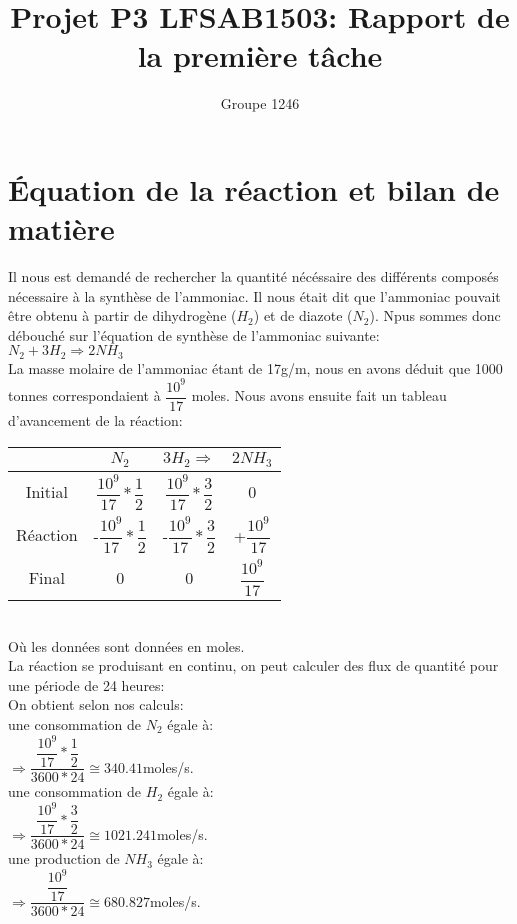 \documentclass[11pt,a4paper]{report}
\author{Groupe 1246}
\title{Projet P3 LFSAB1503: Rapport de la première tâche}
\begin{document}
\maketitle
\section{Équation de la réaction et bilan de matière}
Il nous est demandé de rechercher la quantité nécéssaire des différents composés nécessaire à la synthèse de l'ammoniac. Il nous était dit que l'ammoniac pouvait être obtenu à partir de dihydrogène ($H_2$) et de diazote ($N_2$). Npus sommes donc débouché sur l'équation de synthèse de l'ammoniac suivante: \\
$N_2 + 3H_2 \Rightarrow 2NH_3$ \\
La masse molaire de l'ammoniac étant de 17g/m, nous en avons déduit que 1000 tonnes correspondaient à $\dfrac{10^{9}}{17}$ moles. Nous avons ensuite fait un tableau d'avancement de la réaction: \\
\begin{tabular}{|c|c|c|c|}
\hline 
 & $N_2$ & $3H_2 \Rightarrow$ & $2NH_3$ \\ 
\hline 
Initial & $\dfrac{10^{9}}{17}*\dfrac{1}{2}$ & $\dfrac{10^{9}}{17}*\dfrac{3}{2}$ & 0 \\ 
\hline 
Réaction & -$\dfrac{10^{9}}{17}*\dfrac{1}{2}$ & -$\dfrac{10^{9}}{17}*\dfrac{3}{2}$ & +$\dfrac{10^{9}}{17}$ \\ 
\hline 
Final & 0 & 0 & $\dfrac{10^{9}}{17}$ \\ 
\hline 
\end{tabular} 
\\
Où les données sont données en moles.
\\
La réaction se produisant en continu, on peut calculer des flux de quantité pour une période de 24 heures:\\
On obtient selon nos calculs:\\ une consommation de $N_2$ égale à: \\
$\Rightarrow \dfrac{\dfrac{10^{9}}{17}*\dfrac{1}{2}}{3600*24} \cong 340.41 $moles/s.\\
une consommation de $H_2$ égale à: \\
$\Rightarrow \dfrac{\dfrac{10^{9}}{17}*\dfrac{3}{2}}{3600*24} \cong 1021.241 $moles/s.\\
une production de $NH_3$ égale à: \\
$\Rightarrow \dfrac{\dfrac{10^{9}}{17}}{3600*24} \cong 680.827 $moles/s.\\
\end{document}
